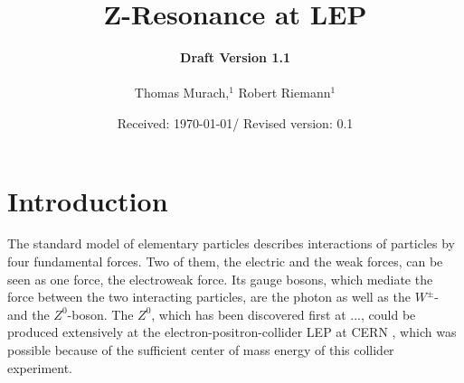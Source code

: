 \documentclass[epj,nopacs]{svjour}
\begin{document}
\hugehead

\newcommand{\dd}[1]{\mathrm{d}#1\,} %
\newcommand{\lref}[1]{listing~(\ref{lst:#1})} %
\newcommand{\fref}[1]{fig.~(\ref{fig:#1})} %
\newcommand{\tref}[1]{tab.~(\ref{tab:#1})} %
\newcommand{\eref}[1]{eq.~(\ref{eqn:#1})} %

\title{Z-Resonance at LEP}
\author{{\bf Draft Version 1.1}\\
\medskip \\
Thomas Murach,$^{1}$
Robert Riemann$^{1}$
} 
\date{Received: \today / Revised version: 0.1}

\maketitle

\vspace*{-1.5cm}
\section{ Introduction}
\baselineskip=0.38cm
\vspace*{1.cm}

The standard model of elementary particles describes interactions of particles
by four fundamental forces. Two of them, the electric and the weak forces, can
be seen as one force, the electroweak force. Its gauge
bosons, which mediate the force between the two interacting particles, are the
photon as well as the $W^{\pm}$- and the $Z^0$-boson. The $Z^0$, which has been
discovered first at ..., could be produced extensively at the
electron-positron-collider LEP at CERN , which was possible
because of the sufficient center of mass energy of this collider experiment.
\end{document}
